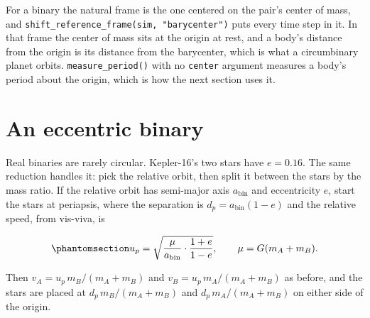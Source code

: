 \documentclass[
  10.5pt,
  letterpaper,
]{scrbook}
\theoremstyle{definition}
\theoremstyle{plain}
\theoremstyle{remark}
\begin{document}
For a binary the natural frame is the one centered on the pair's center
of mass, and \texttt{shift\_reference\_frame(sim,\ "barycenter")} puts
every time step in it. In that frame the center of mass sits at the
origin at rest, and a body's distance from the origin is its distance
from the barycenter, which is what a circumbinary planet orbits.
\texttt{measure\_period()} with no \texttt{center} argument measures a
body's period about the origin, which is how the next section uses it.

\section{An eccentric binary}\label{an-eccentric-binary}

Real binaries are rarely circular. Kepler-16's two stars have
\(e = 0.16\). The same reduction handles it: pick the relative orbit,
then split it between the stars by the mass ratio. If the relative orbit
has semi-major axis \(a_{\mathrm{bin}}\) and eccentricity \(e\), start
the stars at periapsis, where the separation is
\(d_p = a_{\mathrm{bin}}(1-e)\) and the relative speed, from vis-viva,
is

\begin{equation}\protect\phantomsection\label{eq-binary-periapsis}{
u_p = \sqrt{\frac{\mu}{a_{\mathrm{bin}}}\cdot\frac{1+e}{1-e}}, \qquad \mu = G(m_A+m_B).
}\end{equation}

Then \(v_A = u_p\,m_B/(m_A+m_B)\) and \(v_B = u_p\,m_A/(m_A+m_B)\) as
before, and the stars are placed at \(d_p\,m_B/(m_A+m_B)\) and
\(d_p\,m_A/(m_A+m_B)\) on either side of the origin.
\end{document}
